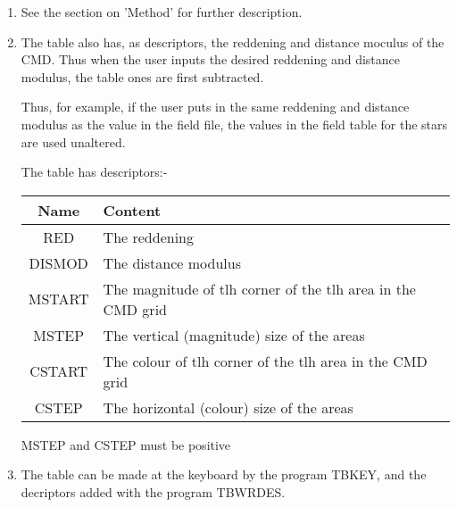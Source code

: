 \begin{small}
{{\begin{enumerate}
\item See the section on 'Method' for further description.
 
\item The table also has, as descriptors, the reddening and distance moculus
      of the CMD. Thus when the user inputs the desired reddening and
      distance modulus, the table ones are first subtracted.
 
      Thus, for example, if the user puts in the same reddening and distance
      modulus as the value in the field file, the values in the field
      table for the stars are used unaltered.
 
      The table has descriptors:-
 
\begin{tabular}{|c|p{4.0in}|}\hline
      Name   &  Content \\ \hline
      RED    &  The reddening \\
      DISMOD &  The distance modulus \\
      MSTART &  The magnitude of tlh corner of the tlh area in the CMD grid \\
      MSTEP  &  The vertical (magnitude) size of the areas \\
      CSTART &  The colour of tlh corner of the tlh area in the CMD grid \\
      CSTEP  &  The horizontal (colour) size of the areas \\ \hline
\end{tabular}
 
      MSTEP and CSTEP must be positive
 
\item The table can be made at the keyboard by the program TBKEY, and the
      decriptors added with the program TBWRDES.
 
\end{enumerate}
 
 
}}
\end{small}
